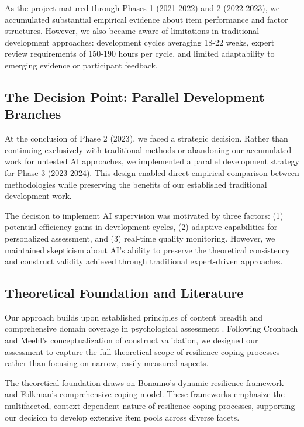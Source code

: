 \documentclass[12pt,a4paper]{article}
\begin{document}
As the project matured through Phases 1 (2021-2022) and 2 (2022-2023), we accumulated substantial empirical evidence about item performance and factor structures. However, we also became aware of limitations in traditional development approaches: development cycles averaging 18-22 weeks, expert review requirements of 150-190 hours per cycle, and limited adaptability to emerging evidence or participant feedback.

\subsection{The Decision Point: Parallel Development Branches}

At the conclusion of Phase 2 (2023), we faced a strategic decision. Rather than continuing exclusively with traditional methods or abandoning our accumulated work for untested AI approaches, we implemented a parallel development strategy for Phase 3 (2023-2024). This design enabled direct empirical comparison between methodologies while preserving the benefits of our established traditional development work.

The decision to implement AI supervision was motivated by three factors: (1) potential efficiency gains in development cycles, (2) adaptive capabilities for personalized assessment, and (3) real-time quality monitoring. However, we maintained skepticism about AI's ability to preserve the theoretical consistency and construct validity achieved through traditional expert-driven approaches.

\subsection{Theoretical Foundation and Literature}

Our approach builds upon established principles of content breadth and comprehensive domain coverage in psychological assessment \cite{Messick1995}. Following Cronbach and Meehl's \cite{Cronbach1955} conceptualization of construct validation, we designed our assessment to capture the full theoretical scope of resilience-coping processes rather than focusing on narrow, easily measured aspects.

The theoretical foundation draws on Bonanno's \cite{Bonanno2004} dynamic resilience framework and Folkman's \cite{Folkman2000} comprehensive coping model. These frameworks emphasize the multifaceted, context-dependent nature of resilience-coping processes, supporting our decision to develop extensive item pools across diverse facets.
\end{document}
